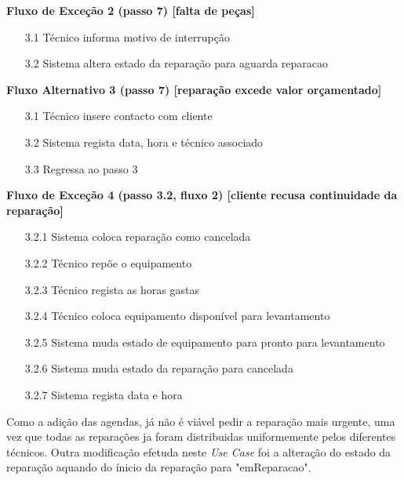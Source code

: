 \documentclass[../relatorio.tex]{subfiles}
\begin{document}
\begin{itemize}
\begin{flushleft}
              \textbf{Fluxo de Exceção 2 (passo 7) [falta de peças]}
          \end{flushleft}
          \begin{itemize}
              \item[3.1]{Técnico informa motivo de interrupção}
              \item[3.2]{Sistema altera estado da reparação para aguarda reparacao}
          \end{itemize}
          \begin{flushleft}
              \textbf{Fluxo Alternativo 3 (passo 7) [reparação excede valor orçamentado]}
          \end{flushleft}
          \begin{itemize}
              \item[3.1]{Técnico insere contacto com cliente}
              \item[3.2]{Sistema regista data, hora e técnico associado}
              \item[3.3]{Regressa ao passo 3}
          \end{itemize}
          \begin{flushleft}
              \textbf{Fluxo de Exceção 4 (passo 3.2, fluxo 2) [cliente recusa continuidade da reparação]}
          \end{flushleft}
          \begin{itemize}
              \item[3.2.1]{Sistema coloca reparação como cancelada}
              \item[3.2.2]{Técnico repõe o equipamento}
              \item[3.2.3]{Técnico regista as horas gastas}
              \item[3.2.4]{Técnico coloca equipamento disponível para levantamento}
              \item[3.2.5]{Sistema muda estado de equipamento para pronto para levantamento}
              \item[3.2.6]{Sistema muda estado da reparação para cancelada}
              \item[3.2.7]{Sistema regista data e hora} 
          \end{itemize}
\end{itemize}

Como a adição das agendas, já não é viável pedir a reparação mais urgente, uma vez que todas as reparações ja foram distribuidas
uniformemente pelos diferentes técnicos.
Outra modificação efetuda neste \textit{Use Case} foi a alteração do estado da reparação aquando do ínicio da reparação para "emReparacao".
\end{document}
